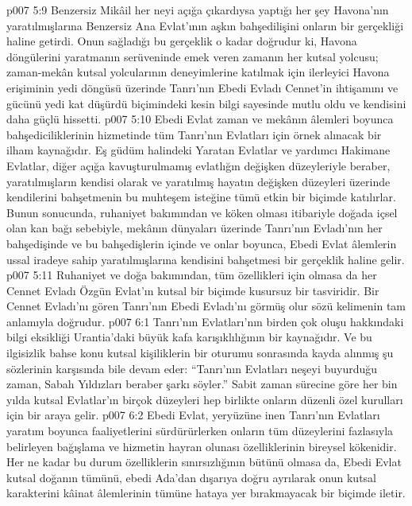 \vs p007 5:9 Benzersiz Mikâil her neyi açığa çıkardıysa yaptığı her şey Havona’nın yaratılmışlarına Benzersiz Ana Evlat’ının aşkın bahşedilişini onların bir gerçekliği haline getirdi. Onun sağladığı bu gerçeklik o kadar doğrudur ki, Havona döngülerini yaratmanın serüveninde emek veren zamanın her kutsal yolcusu; zaman\hyp{}mekân kutsal yolcularının deneyimlerine katılmak için ilerleyici Havona erişiminin yedi döngüsü üzerinde Tanrı'nın Ebedi Evladı Cennet’in ihtişamını ve gücünü yedi kat düşürdü biçimindeki kesin bilgi sayesinde mutlu oldu ve kendisini daha güçlü hissetti.
\vs p007 5:10 Ebedi Evlat zaman ve mekânın âlemleri boyunca bahşediciliklerinin hizmetinde tüm Tanrı'nın Evlatları için örnek alınacak bir ilham kaynağıdır. Eş güdüm halindeki Yaratan Evlatlar ve yardımcı Hakimane Evlatlar, diğer açığa kavuşturulmamış evlatlığın değişken düzeyleriyle beraber, yaratılmışların kendisi olarak ve yaratılmış hayatın değişken düzeyleri üzerinde kendilerini bahşetmenin bu muhteşem isteğine tümü etkin bir biçimde katılırlar. Bunun sonucunda, ruhaniyet bakımından ve köken olması itibariyle doğada içsel olan kan bağı sebebiyle, mekânın dünyaları üzerinde Tanrı'nın Evladı’nın her bahşedişinde ve bu bahşedişlerin içinde ve onlar boyunca, Ebedi Evlat âlemlerin ussal iradeye sahip yaratılmışlarına kendisini bahşetmesi bir gerçeklik haline gelir.
\vs p007 5:11 Ruhaniyet ve doğa bakımından, tüm özellikleri için olmasa da her Cennet Evladı Özgün Evlat’ın kutsal bir biçimde kusursuz bir tasviridir. Bir Cennet Evladı’nı gören Tanrı'nın Ebedi Evladı’nı görmüş olur sözü kelimenin tam anlamıyla doğrudur.
\vs p007 6:1 Tanrı'nın Evlatları’nın birden çok oluşu hakkındaki bilgi eksikliği Urantia’daki büyük kafa karışıklılığının bir kaynağıdır. Ve bu ilgisizlik bahse konu kutsal kişiliklerin bir oturumu sonrasında kayda alınmış şu sözlerinin karşısında bile devam eder: “Tanrı'nın Evlatları neşeyi buyurduğu zaman, Sabah Yıldızları beraber şarkı söyler.” Sabit zaman sürecine göre her bin yılda kutsal Evlatlar’ın birçok düzeyleri hep birlikte onların düzenli özel kurulları için bir araya gelir.
\vs p007 6:2 Ebedi Evlat, yeryüzüne inen Tanrı'nın Evlatları yaratım boyunca faaliyetlerini sürdürürlerken onların tüm düzeylerini fazlasıyla belirleyen bağışlama ve hizmetin hayran olunası özelliklerinin bireysel kökenidir. Her ne kadar bu durum özelliklerin sınırsızlığının bütünü olmasa da, Ebedi Evlat kutsal doğanın tümünü, ebedi Ada’dan dışarıya doğru ayrılarak onun kutsal karakterini kâinat âlemlerinin tümüne hataya yer bırakmayacak bir biçimde iletir.

